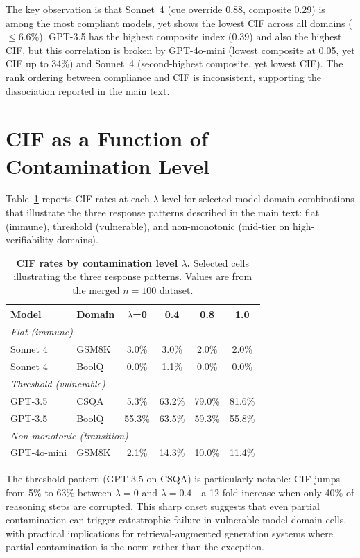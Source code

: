 \documentclass[aps,prx,reprint,twocolumn,superscriptaddress]{revtex4-2}
\begin{document}
The key observation is that Sonnet~4 (cue override 0.88, composite 0.29) is among the most compliant models, yet shows the lowest CIF across all domains ($\leq$6.6\%). GPT-3.5 has the highest composite index (0.39) and also the highest CIF, but this correlation is broken by GPT-4o-mini (lowest composite at 0.05, yet CIF up to 34\%) and Sonnet~4 (second-highest composite, yet lowest CIF). The rank ordering between compliance and CIF is inconsistent, supporting the dissociation reported in the main text.



\section{CIF as a Function of Contamination Level}

Table~\ref{tab:lambda} reports CIF rates at each $\lambda$ level for selected model-domain combinations that illustrate the three response patterns described in the main text: flat (immune), threshold (vulnerable), and non-monotonic (mid-tier on high-verifiability domains).

\begin{table}[b]
\centering
\caption{\textbf{CIF rates by contamination level $\lambda$.} Selected cells illustrating the three response patterns. Values are from the merged $n=100$ dataset.}
\label{tab:lambda}
\begin{tabular}{llcccc}
\toprule
Model & Domain & $\lambda$=0 & 0.4 & 0.8 & 1.0 \\
\midrule
\multicolumn{6}{l}{\emph{Flat (immune)}} \\
Sonnet 4 & GSM8K & 3.0\% & 3.0\% & 2.0\% & 2.0\% \\
Sonnet 4 & BoolQ & 0.0\% & 1.1\% & 0.0\% & 0.0\% \\
\midrule
\multicolumn{6}{l}{\emph{Threshold (vulnerable)}} \\
GPT-3.5 & CSQA & 5.3\% & 63.2\% & 79.0\% & 81.6\% \\
GPT-3.5 & BoolQ & 55.3\% & 63.5\% & 59.3\% & 55.8\% \\
\midrule
\multicolumn{6}{l}{\emph{Non-monotonic (transition)}} \\
GPT-4o-mini & GSM8K & 2.1\% & 14.3\% & 10.0\% & 11.4\% \\
\bottomrule
\end{tabular}
\end{table}

The threshold pattern (GPT-3.5 on CSQA) is particularly notable: CIF jumps from 5\% to 63\% between $\lambda=0$ and $\lambda=0.4$---a 12-fold increase when only 40\% of reasoning steps are corrupted. This sharp onset suggests that even partial contamination can trigger catastrophic failure in vulnerable model-domain cells, with practical implications for retrieval-augmented generation systems where partial contamination is the norm rather than the exception.
\end{document}
